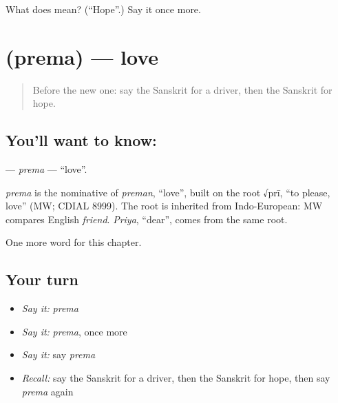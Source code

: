 \begin{tcolorbox}[breakable,colback=teal!4,colframe=teal!35!black,title={Before you move on}]
What does  mean? (\textquotedblleft{}Hope\textquotedblright{}.) Say it once more.
\end{tcolorbox}
\section[\texorpdfstring{\sk{प्रेम} (prema)}{प्रेम (prema)}]{ (prema) — love}

\label{lesson:SA-C239-prema}



\begin{quote}
Before the new one: say the Sanskrit for a driver, then the Sanskrit for hope.
\end{quote}

\subsection*{You'll want to know: }
\textbf{} — \emph{prema} — \textquotedblleft{}love\textquotedblright{}.

\begin{cousinweb}
\emph{prema} is the nominative of \emph{preman}, \textquotedblleft{}love\textquotedblright{}, built on the root √prī, \textquotedblleft{}to please, love\textquotedblright{} (MW; CDIAL 8999). The root is inherited from Indo-European: MW compares English \emph{friend}. \emph{Priya}, \textquotedblleft{}dear\textquotedblright{}, comes from the same root.
\end{cousinweb}

\begin{grammarlens}[title={What you've built}]
One more word for this chapter.
\end{grammarlens}

\subsection*{Your turn}
\begin{itemize}
\raggedright
  \item \emph{Say it:} \emph{prema}
  \item \emph{Say it:} \emph{prema}, once more
  \item \emph{Say it:} say \emph{prema}
  \item \emph{Recall:} say the Sanskrit for a driver, then the Sanskrit for hope, then say \emph{prema} again
\end{itemize}

